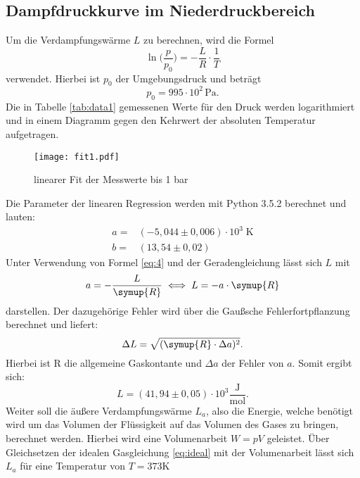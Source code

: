 \subsection{Dampfdruckkurve im Niederdruckbereich}
Um die Verdampfungswärme $L$ zu berechnen, wird die Formel
\begin{equation*}
  \ln \biggl(\frac{p}{p_0}\biggr)=-\frac{L}{R} \cdot \frac{1}{T}
\end{equation*}
verwendet. Hierbei ist $p_0$ der Umgebungsdruck und beträgt
\begin{equation*}
  p_0=995\cdot 10^2 \,\si{\pascal}.
\end{equation*}
Die in Tabelle \ref{tab:data1} gemessenen Werte für den Druck werden logarithmiert und in einem
Diagramm gegen den Kehrwert der absoluten Temperatur aufgetragen.

\begin{figure}[H]
  \centering
  \texttt{[image: fit1.pdf]}
  \caption{linearer Fit der Messwerte bis 1 bar}
  \label{fig:fit1}
  \end{figure}
Die Parameter der linearen Regression werden mit Python 3.5.2 berechnet und
lauten:
\begin{align*}
  a =& (-5,044 \pm 0,006) \cdot 10^3 \; \si{\kelvin} \\
  b =& (13,54 \pm 0,02)
\end{align*}
Unter Verwendung von Formel \eqref{eq:4} und der Geradengleichung
lässt sich $L$ mit
\begin{equation}
  a=-\frac{L}{\symup{R}} \iff L = -a \cdot \symup{R}
\end{equation}
darstellen. Der dazugehörige Fehler wird über die Gaußsche Fehlerfortpflanzung
berechnet und liefert:
\begin{equation}
  \Delta L = \sqrt{(\symup{R} \cdot \Delta a)^2}.
  \label{eqn:fehler}
\end{equation}
Hierbei ist R die allgemeine Gaskontante und $\Delta a$ der Fehler von $a$.
Somit ergibt sich:
\begin{equation*}
  L=(41,94 \pm 0,05)\cdot 10^3 \frac{\si{\joule}}{\si{\mol}}.
\end{equation*}
Weiter soll die äußere Verdampfungswärme $L_a$, also die Energie, welche
benötigt wird um das Volumen der Flüssigkeit auf das Volumen des Gases
zu bringen, berechnet werden. Hierbei wird eine Volumenarbeit $W=pV$ geleistet.
Über Gleichsetzen der idealen Gasgleichung \eqref{eq:ideal} mit der
Volumenarbeit lässt sich $L_a$ für eine Temperatur von $T=373 \si{\kelvin}$
